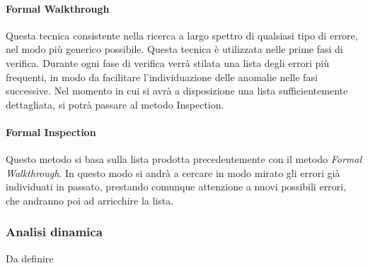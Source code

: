 		\paragraph{{Formal Walkthrough}}
		Questa tecnica consistente nella ricerca a largo spettro di qualsiasi tipo di errore, nel modo più generico possibile. 
		Questa tecnica è utilizzata nelle prime fasi di verifica. Durante ogni fase di verifica verrà stilata una lista degli errori più frequenti, in modo da facilitare l’individuazione delle anomalie nelle fasi successive. 
		Nel momento in cui si avrà a disposizione una lista sufficientemente dettagliata, si potrà passare al metodo Inspection.
		
		
		\paragraph{{Formal Inspection}}
		Questo metodo si basa sulla lista prodotta precedentemente con il metodo \textit{Formal Walkthrough}. In questo modo si andrà a cercare in modo mirato gli errori già individuati in passato, prestando comunque attenzione a nuovi possibili errori, che andranno poi ad arricchire la lista.
		
		
		\subsubsection{Analisi dinamica}
		Da definire
		
	
	